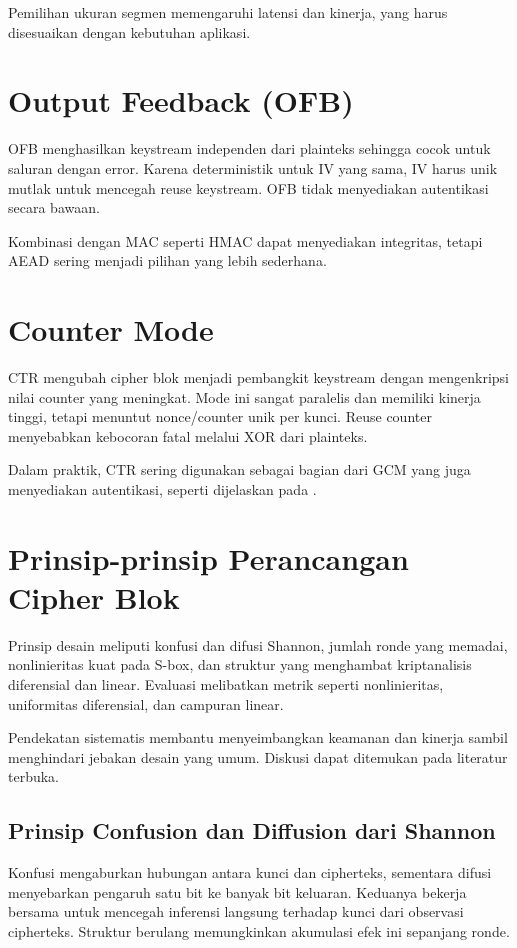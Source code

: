 \documentclass[../main.tex]{subfiles}
\begin{document}
Pemilihan ukuran segmen memengaruhi latensi dan kinerja, yang harus disesuaikan dengan kebutuhan aplikasi.

\section{Output Feedback (OFB)}
OFB menghasilkan keystream independen dari plainteks sehingga cocok untuk saluran dengan error. Karena deterministik untuk IV yang sama, IV harus unik mutlak untuk mencegah reuse keystream. OFB tidak menyediakan autentikasi secara bawaan.

Kombinasi dengan MAC seperti HMAC dapat menyediakan integritas, tetapi AEAD sering menjadi pilihan yang lebih sederhana.

\section{Counter Mode}
CTR mengubah cipher blok menjadi pembangkit keystream dengan mengenkripsi nilai counter yang meningkat. Mode ini sangat paralelis dan memiliki kinerja tinggi, tetapi menuntut nonce/counter unik per kunci. Reuse counter menyebabkan kebocoran fatal melalui XOR dari plainteks.

Dalam praktik, CTR sering digunakan sebagai bagian dari GCM yang juga menyediakan autentikasi, seperti dijelaskan pada \textcite{nist80038d}.

\section{Prinsip-prinsip Perancangan Cipher Blok}
Prinsip desain meliputi konfusi dan difusi Shannon, jumlah ronde yang memadai, nonlinieritas kuat pada S-box, dan struktur yang menghambat kriptanalisis diferensial dan linear. Evaluasi melibatkan metrik seperti nonlinieritas, uniformitas diferensial, dan campuran linear.

Pendekatan sistematis membantu menyeimbangkan keamanan dan kinerja sambil menghindari jebakan desain yang umum. Diskusi dapat ditemukan pada literatur terbuka.

\subsection{Prinsip Confusion dan Diffusion dari Shannon}
Konfusi mengaburkan hubungan antara kunci dan cipherteks, sementara difusi menyebarkan pengaruh satu bit ke banyak bit keluaran. Keduanya bekerja bersama untuk mencegah inferensi langsung terhadap kunci dari observasi cipherteks. Struktur berulang memungkinkan akumulasi efek ini sepanjang ronde.
\end{document}
